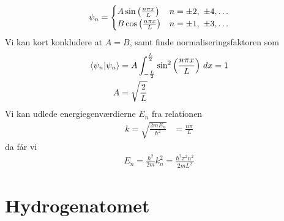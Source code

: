 \documentclass[12pt]{article}
\theoremstyle{definition}
\theoremstyle{remark}
\theoremstyle{definition}
\numberwithin{equation}{section}
\begin{document}
\begin{align}
    \psi_n = \begin{cases}
    A\sin\qty(\frac{n\pi x}{L}) & n=\pm2,~\pm 4,\dots \\
    B\cos\qty(\frac{n\pi x}{L}) & n=\pm1,~\pm 3,\dots
    \end{cases}
\end{align}
Vi kan kort konkludere at $A=B$, samt finde normaliseringsfaktoren som
\begin{align}
\begin{split}
    \braket{\psi_n}{\psi_n} &= A \int_{-\frac{L}{2}}^{\frac{L}{2}} \sin^2\qty(\frac{n\pi x}{L})~dx=1 \\
    A &= \sqrt{\frac{2}{L}}
\end{split}
\end{align}
Vi kan udlede energiegenværdierne $E_n$ fra relationen
\begin{align}
    k = \sqrt{\frac{2mE_n}{\hbar^2}} &= \frac{n\pi}{L}
\end{align}
da får vi
\begin{align}
    E_n = \frac{\hbar^2}{2m}k^2_n = \frac{\hbar^2\pi^2n^2}{2mL^2}
\end{align}

\section{Hydrogenatomet}
\end{document}
